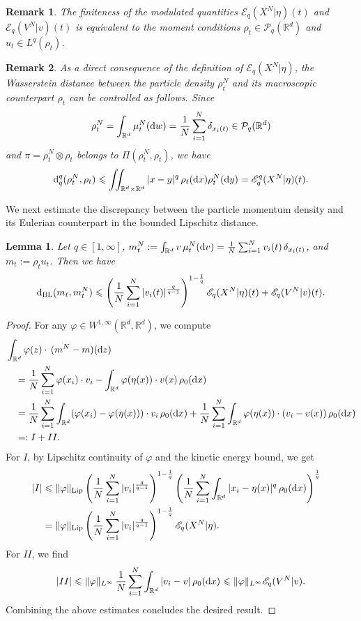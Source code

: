 \documentclass[10pt,reqno]{amsart}
\renewcommand{\leq}{\leqslant}
\renewcommand{\le}{\leqslant}
\numberwithin{equation}{section}
\newtheorem{lemma}{Lemma}[section]
\newtheorem{remark}{Remark}[section]
\newcommand{\R}{\mathbb R}
\newcommand{\lt}{\left}
\newcommand{\rt}{\right}
\newcommand{\intr}{\int_{\R^d}}
\newcommand{\intrr}{\iint_{\R^d \times \R^d}}
\newcommand{\calP}{\mathcal P}
\newcommand{\rd}{\textnormal{d}}
\newcommand{\dx}{\textnormal{d}x}
\newcommand{\dv}{\textnormal{d}v}
\newcommand{\dy}{\textnormal{d}y}
\newcommand{\dw}{\textnormal{d}w}
\newcommand{\dz}{\textnormal{d}z}
\begin{document}
\begin{remark} The finiteness of the modulated quantities $\mathscr{E}_q(X^N|\eta)(t)$ and $\mathscr{E}_q(V^N|v)(t)$ is equivalent to the moment conditions $\rho_t \in \calP_q(\R^d)$ and $u_t \in L^q(\rho_t)$.
\end{remark}

\begin{remark}As a direct consequence of the definition of $\mathscr{E}_q(X^N|\eta)$, the Wasserstein distance between the particle density $\rho_t^N$ and its macroscopic counterpart $\rho_t$ can be controlled as follows. Since 
\[
\rho_t^N= \intr \mu^N_t(\dw) = \frac1N\sum_{i=1}^N\delta_{x_i(t)} \in \calP_q(\R^d) 
\]
and $\pi=\rho_t^N \otimes \rho_t $ belongs to $\Pi(\rho_t^N,\rho_t)$, we have
\[
{\rd}_q^q(\rho_t^N,\rho_t) \le \intrr |x-y|^q\,\rho_t(\dx)\rho_t^N(\dy)= \mathscr{E}_q^q(X^N|\eta)(t).
\]
\end{remark}
 
We next estimate the discrepancy between the particle momentum density and its Eulerian counterpart in the bounded Lipschitz distance.
\begin{lemma} Let $q \in [1,\infty]$, $m_t^N := \intr v\,\mu_t^N(\dv) = \frac1N\sum_{i=1}^N v_i(t)\,\delta_{x_i(t)}$, and $m_t := \rho_t u_t$. Then we have
\[
{\rd}_{\rm BL} (m_t, m_t^N) \leq \lt(\frac1N\sum_{i=1}^N |v_i(t)|^{\frac{q}{q-1}} \rt)^{1 - \frac1q} \mathscr{E}_q(X^N|\eta)(t) + \mathscr{E}_q(V^N|v)(t).
\]
\end{lemma}
\begin{proof}
For any $\varphi \in W^{1,\infty}(\R^d, \R^d)$, we compute
\begin{align*}
&\intr \varphi(z) \cdot \, (m^N-m)(\dz)\cr
&\quad = \frac1N\sum_{i=1}^N \varphi(x_i)\cdot v_i  -  \intr \varphi(\eta(x))\cdot v(x)\,\rho_0(\dx)\\
&\quad = \frac1N\sum_{i=1}^N \intr (\varphi(x_i)-\varphi(\eta(x)) )\cdot v_i\,\rho_0(\dx)
 +  \frac1N\sum_{i=1}^N \intr \varphi(\eta(x))\cdot (v_i-v(x) )\,\rho_0(\dx)\\
&\quad =:  I + II.
\end{align*}
For $I$, by Lipschitz continuity of $\varphi$ and the kinetic energy bound, we get
\begin{align*}
|I| &\le \|\varphi\|_{\rm Lip}\lt(\frac1N\sum_{i=1}^N |v_i|^{\frac{q}{q-1}} \rt)^{1 - \frac1q}\lt(\frac1N\sum_{i=1}^N \intr |x_i-\eta(x)|^q\,\rho_0(\dx)\rt)^\frac1q\cr
& =  \|\varphi\|_{\rm Lip}\lt(\frac1N\sum_{i=1}^N |v_i|^{\frac{q}{q-1}} \rt)^{1 - \frac1q}\mathscr{E}_q(X^N|\eta).
\end{align*}
For $II$, we find
\[
|II| \le \|\varphi\|_{L^\infty}\,\frac1N\sum_{i=1}^N \intr |v_i-v|\,\rho_0(\dx) \le \|\varphi\|_{L^\infty} \mathscr{E}_q(V^N|v).
\]
Combining the above estimates concludes the desired result.
\end{proof}
\end{document}
